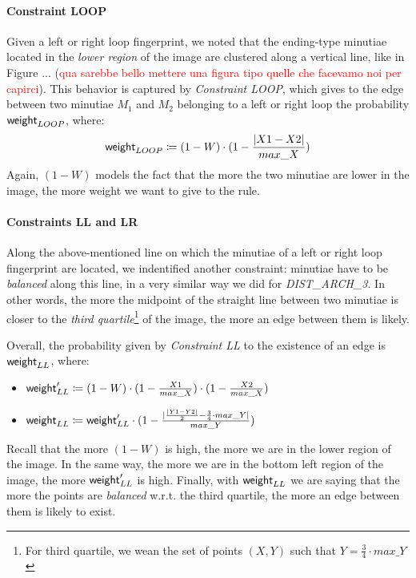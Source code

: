 \documentclass[8pt]{article}
\begin{document}
\paragraph{Constraint LOOP}
Given a left or right loop fingerprint, we noted that the ending-type
minutiae located in the \emph{lower region} of the image are clustered along
a vertical line, like in Figure ... (\textcolor{red}{qua sarebbe bello mettere
una figura tipo quelle che facevamo noi per capirci}).  
This behavior is captured by \emph{Constraint LOOP}, which gives to
the edge between two minutiae $M_1$ and $M_2$ belonging to a left or right loop
the probability $\textsf{weight}_{LOOP}$, where:
  \begin{align*}
    \textsf{weight}_{LOOP} \coloneqq
    (1-W)\cdot 
    (1-\frac{\lvert X1-X2 \rvert}{max\_X})
  \end{align*}
Again, $(1-W)$ models the fact that the more the two minutiae are lower in 
the image, the more weight we want to give to the rule.  


\paragraph{Constraints LL and LR}
Along the above-mentioned line on which the minutiae of a left or right loop
fingerprint are located, we indentified another constraint: minutiae have to
be \emph{balanced} along this line, in a very similar way we did for
\emph{DIST\_ARCH\_3}. In other words, the more the midpoint of the straight line 
between two minutiae is closer to the \emph{third quartile}\footnote{For third
quartile, we wean the set of points $(X,Y)$ such that $Y=\frac{3}{4}\cdot
max\_Y$} of the image, the more an edge between them is likely.

Overall, the probability given by \emph{Constraint LL} to the existence of
an edge is $\textsf{weight}_{LL}$, where:
  \begin{itemize}
    \item
      $\textsf{weight}_{LL}^\prime \coloneqq 
        (1-W) \cdot (1-\frac{X1}{max\_X}) \cdot (1-\frac{X2}{max\_X})$ 
    \item
      $\textsf{weight}_{LL} \coloneqq
        \textsf{weight}_{LL}^\prime \cdot (1-
        \frac{\lvert \frac{\lvert Y1-Y2 \rvert}{2} - \frac{3}{4}\cdot max\_Y
        \rvert}{max\_Y})$
  \end{itemize}
Recall that the more $(1-W)$ is high, the more we are in the lower region
of the image. In the same way, the more we are in the bottom left region of the
image, the more $\textsf{weight}_{LL}^\prime$ is high. 
Finally, with $\textsf{weight}_{LL}$ we are saying that the more the points are 
\emph{balanced} w.r.t. the third quartile, the more an edge between them
is likely to exist.
\end{document}
